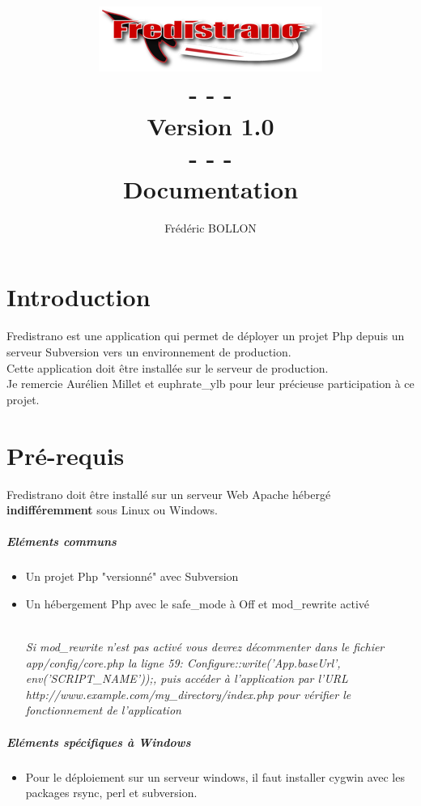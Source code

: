 \documentclass[12pt,a4paper]{report}
\author{Frédéric BOLLON}
\title{\includegraphics{doc_fredistrano2.png}\\- - -\\Version 1.0\\- - -\\Documentation\\}
\begin{document}
\maketitle

\tableofcontents

\chapter{Introduction}
Fredistrano est une application qui permet de déployer un projet Php depuis un serveur Subversion vers un environnement de production.\\
Cette application doit \^{e}tre installée sur le serveur de production.\\

Je remercie Aurélien Millet et euphrate\_ylb pour leur précieuse participation à ce projet.

\chapter{Pré-requis}

Fredistrano doit \^{e}tre installé sur un serveur Web Apache hébergé \textbf{indifféremment} sous Linux ou Windows. 

\paragraph*{Eléments communs}
\begin{itemize}
\item
Un projet Php "versionné" avec Subversion
\item 
Un hébergement Php avec le safe\_mode à Off et mod\_rewrite activé	\\\\
\begin{small}\textit{Si mod\_rewrite n'est pas activé vous devrez décommenter dans le fichier app/config/core.php la ligne 59: Configure::write('App.baseUrl', env('SCRIPT\_NAME'));, puis accéder à l'application par l'URL\\ http://www.example.com/my\_directory/index.php pour vérifier le fonctionnement de l'application}\end{small}
\end{itemize}

\paragraph*{Eléments spécifiques à Windows}
\begin{itemize}
\item
Pour le déploiement sur un serveur windows, il faut installer cygwin avec les packages rsync, perl et subversion.

\end{itemize}
\end{document}
